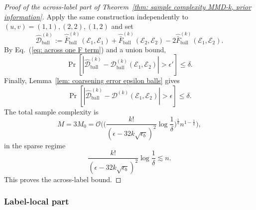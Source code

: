 \documentclass[aps,prx,reprint,superscriptaddress,amsmath,amssymb,longbibliography,floatfix]{revtex4-2}
\newcommand{\Abs}[1]{\left\lvert #1\right\rvert}
\newcommand{\scD}{\mathcal{D}}
\newcommand{\scE}{\mathcal{E}}
\newcommand{\scO}{\mathcal{O}}
\theoremstyle{plain}
\theoremstyle{definition}
\theoremstyle{remark}
\begin{document}
\begin{proof}[Proof of the across-label part of Theorem~\ref{thm: sample complexity MMD-k, prior information}]
    Apply the same construction independently to $(u,v)=(1,1),(2,2),(1,2)$ and set
    \begin{equation}
        \widehat{\scD}^{(k)}_{\mathrm{ball}}
        :=
        \widehat{\bar F}^{(k)}_{\mathrm{ball}}(\scE_1,\scE_1)
        +
        \widehat{\bar F}^{(k)}_{\mathrm{ball}}(\scE_2,\scE_2)
        -
        2\widehat{\bar F}^{(k)}_{\mathrm{ball}}(\scE_1,\scE_2).
    \end{equation}
    By Eq.~(\ref{eq: across one F term}) and a union bound,
    \begin{equation}
        \Pr\!\left[
            \Abs{
                \widehat{\scD}^{(k)}_{\mathrm{ball}}
                -
                \scD^{(k)}_{\mathrm{ball}}(\scE_1,\scE_2)
            }
            >
            \epsilon'
        \right]
        \le
        \delta.
    \end{equation}
    Finally, Lemma~\ref{lem: coarsening error epsilon balls} gives
    \begin{equation}
        \Pr\!\left[
            \Abs{
                \widehat{\scD}^{(k)}_{\mathrm{ball}}
                -
                \scD^{(k)}(\scE_1,\scE_2)
            }
            >
            \epsilon
        \right]
        \le
        \delta.
    \end{equation}
    The total sample complexity is
    \begin{equation}
        M
        =
        3M_0
        =
        \scO\Bigg(
        \bigg(
            \frac{k!}{(\epsilon-32k\sqrt{\epsilon_b})^2}
            \log\frac1\delta
        \bigg)^{\frac1k}
        n^{1-\frac1k}
        \Bigg),
    \end{equation}
    in the sparse regime
    \[
        \frac{k!}{(\epsilon-32k\sqrt{\epsilon_b})^2}
        \log\frac1\delta
        \lesssim n.
    \]
    This proves the across-label bound.
\end{proof}

\subsubsection{Label-local part}
\label{appsub: MMD-k prior information label-local}
\end{document}

